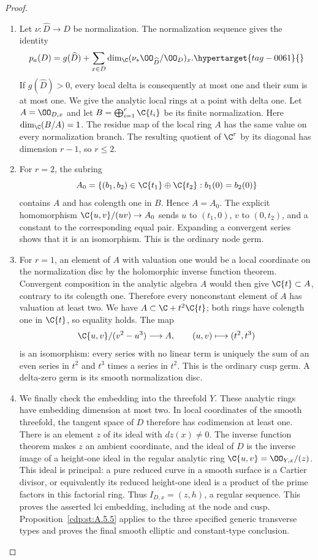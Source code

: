 \begin{proof}
\begin{enumerate}[label={$\langle1\rangle$\arabic*.},leftmargin=*]
\item Let $\nu:\widehat D\to D$ be normalization. The
normalization sequence gives the identity
\begin{equation}
 p_a(D)=g(\widehat D)+
        \sum_{x\in D}\dim_{\C}
          (\nu_*\OO_{\widehat D}/\OO_D)_x.       \hypertarget{tag-0061}{}\label{cdp:eq:A.J.32}
\end{equation}
If $g(\widehat D)>0$, every local delta is consequently
at most one and their sum is at most one. We give the
analytic local rings at a point with delta one.
Let $A=\OO_{D,x}$ and let
$B=\bigoplus_{i=1}^r\C\{t_i\}$ be its finite
normalization. Here $\dim_{\C}(B/A)=1$. The residue map
of the local ring $A$ has the same value on every
normalization branch. The resulting quotient of
$\C^r$ by its diagonal has dimension $r-1$, so
$r\le2$.

\item For $r=2$, the subring
\[
 A_0=\{(b_1,b_2)\in\C\{t_1\}\oplus\C\{t_2\}:
                                  b_1(0)=b_2(0)\}
\]
contains $A$ and has colength one in $B$. Hence
$A=A_0$. The explicit homomorphism
$\C\{u,v\}/(uv)\to A_0$ sends
$u$ to $(t_1,0)$, $v$ to $(0,t_2)$, and a constant
to the corresponding equal pair. Expanding a
convergent series shows that it is an isomorphism.
This is the ordinary node germ.

\item For $r=1$, an element of $A$ with valuation one would
be a local coordinate on the normalization disc by
the holomorphic inverse function theorem. Convergent
composition in the analytic algebra $A$ would then
give $\C\{t\}\subset A$, contrary to its colength
one. Therefore every nonconstant element of $A$ has
valuation at least two. We have
$A\subset\C+t^2\C\{t\}$; both rings have
colength one in $\C\{t\}$, so equality holds.
The map
\[
 \C\{u,v\}/(v^2-u^3)\longrightarrow A,
                 \qquad (u,v)\longmapsto(t^2,t^3)
\]
is an isomorphism: every series with no linear term
is uniquely the sum of an even series in $t^2$ and
$t^3$ times a series in $t^2$. This is the ordinary
cusp germ. A delta-zero germ is its smooth
normalization disc.

\item We finally check the embedding into the threefold $Y$. These analytic rings have embedding
dimension at most two. In local coordinates of the
smooth threefold, the tangent space of $D$ therefore
has codimension at least one. There is an element
$z$ of its ideal with $dz(x)\ne0$. The inverse
function theorem makes $z$ an ambient coordinate,
and the ideal of $D$ is the inverse image of a
height-one ideal in the regular analytic ring
$\C\{u,v\}=\OO_{Y,x}/(z)$. This ideal is principal:
a pure reduced curve in a smooth surface is a Cartier
divisor, or equivalently its reduced height-one ideal
is a product of the prime factors in this factorial
ring. Thus $I_{D,x}=(z,h)$, a regular sequence.
This proves the asserted lci embedding, including
at the node and cusp. Proposition~\ref{cdp:st:A.5.5} applies
to the three specified generic transverse types
and proves the final smooth elliptic and constant-type
conclusion.


\end{enumerate}
\end{proof}

